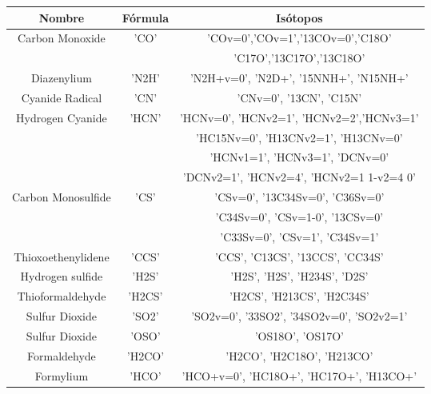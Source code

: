 \begin {table}[H]
\begin{center}
	\begin{tabular}{|c|c|c|}
		\hline Nombre & Fórmula &  Isótopos \\ 

		\hline 	Carbon Monoxide & 'CO' & 'COv=0','COv=1','13COv=0','C18O'\\
								&	   & 'C17O','13C17O','13C18O' \\
		
		\hline	Diazenylium & 'N2H' & 'N2H+v=0', 'N2D+', '15NNH+', 'N15NH+' \\
			
		\hline	Cyanide Radical & 'CN' & 'CNv=0', '13CN', 'C15N' \\
			
		\hline	Hydrogen Cyanide & 'HCN' & 'HCNv=0', 'HCNv2=1', 'HCNv2=2','HCNv3=1' \\
								 &       & 'HC15Nv=0', 'H13CNv2=1', 'H13CNv=0'\\ &       & 'HCNv1=1', 'HCNv3=1', 'DCNv=0'\\ &       & 'DCNv2=1', 'HCNv2=4',  'HCNv2=1 1-v2=4 0' \\
						
		\hline  Carbon Monosulfide & 'CS' & 'CSv=0', '13C34Sv=0', 'C36Sv=0'\\
						    	   &      & 'C34Sv=0', 'CSv=1-0', '13CSv=0'\\
							       &      & 'C33Sv=0', 'CSv=1', 'C34Sv=1' \\
			
		\hline	Thioxoethenylidene & 'CCS' & 'CCS', 'C13CS', '13CCS', 'CC34S' \\
			
		\hline	Hydrogen sulfide & 'H2S' & 'H2S', 'H2S', 'H234S', 'D2S' \\
			
		\hline	Thioformaldehyde & 'H2CS' & 'H2CS', 'H213CS', 'H2C34S' \\
			
		\hline	Sulfur Dioxide & 'SO2' & 'SO2v=0', '33SO2', '34SO2v=0', 'SO2v2=1' \\
			
		\hline	Sulfur Dioxide & 'OSO' & 'OS18O', 'OS17O' \\
			
		\hline	Formaldehyde & 'H2CO'  & 'H2CO', 'H2C18O', 'H213CO' \\
			
		\hline	Formylium & 'HCO'  & 'HCO+v=0', 'HC18O+', 'HC17O+', 'H13CO+' \\
			

\end{tabular}
\end{center}
\end{table}
